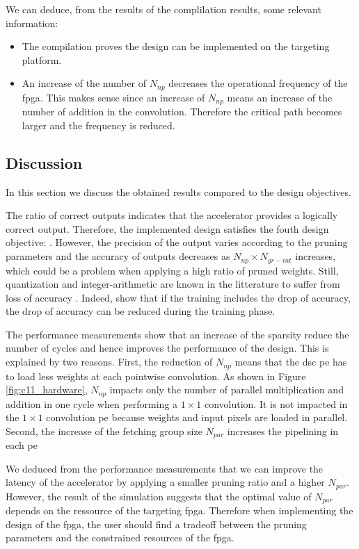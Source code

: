 We can deduce, from the results of the complilation results, some relevant information:
\begin{itemize}
    \item The compilation proves the design can be implemented on the targeting platform.
    \item An increase of the number of $N_{np}$ decreases the operational frequency of the \acrshort{fpga}. This makes sense since an increase of $N_{np}$ means an increase of the number of addition in the convolution. Therefore the critical path becomes larger and the frequency is reduced.
\end{itemize}
%
\subsection{Discussion} \label{subs:discus}
%
In this section we discuss the obtained results compared to the design objectives.

The ratio of correct outputs indicates that the accelerator provides a logically correct output. Therefore, the implemented design satisfies the fouth design objective: . However, the precision of the output varies according to the pruning parameters and the accuracy of outputs decreases as $N_{np} \times N_{gr-int}$ increases, which could be a problem when applying a high ratio of pruned weights. Still, quantization and integer-arithmetic are known in the litterature to suffer from loss of accuracy \cite{wu_quantized_2016, jacob_quantization_2017}. Indeed, \textcite{wu_quantized_2016, jacob_quantization_2017} show that if the training includes the drop of accuracy, the drop of accuracy can be reduced during the training phase.

The performance measurements show that an increase of the sparsity reduce the number of cycles and hence improves the performance of the design. This is explained by two reasons. First, the reduction of $N_{np}$ means that the \acrshort{dsc} \acrshort{pe} has to load less weights at each pointwise convolution.
As shown in Figure \ref{fig:c11_hardware}, $N_{np}$ impacts only the number of parallel multiplication and addition in one cycle when performing a $1 \times 1$ convolution. It is not impacted in the $1 \times 1$ convolution \acrshort{pe} because weights and input pixels are loaded in parallel. Second, the increase of the fetching group size $N_{par}$ increases the pipelining in each \acrshort{pe}

We deduced from the performance measurements that we can improve the latency of the accelerator by applying a smaller pruning ratio and a higher $N_{par}$. However, the result of the simulation suggests that the optimal value of $N_{par}$ depends on the ressource of the targeting \acrshort{fpga}. Therefore when implementing the design of the \acrshort{fpga}, the user should find a tradeoff between the pruning parameters and the constrained resources of the \acrshort{fpga}.
